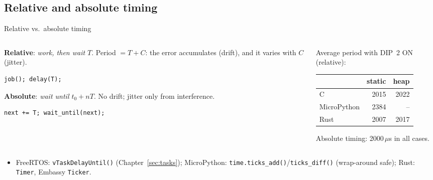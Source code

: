 \subsection{Relative and absolute timing}
\begin{frame}[fragile]{Relative vs.\ absolute timing}
  \begin{columns}[T]
    \begin{column}{0.5\textwidth}
      \small
      \textbf{Relative}: \emph{work, then wait $T$}. Period $= T + C$: the error accumulates (drift), and it varies with $C$ (jitter).
\begin{lstlisting}[numbers=none]
job(); delay(T);
\end{lstlisting}
      \textbf{Absolute}: \emph{wait until $t_0 + nT$}. No drift; jitter only from interference.
\begin{lstlisting}[numbers=none]
next += T; wait_until(next);
\end{lstlisting}
    \end{column}
    \begin{column}{0.48\textwidth}
      \small
      Average period with DIP~2 ON (relative):
      \begin{center}
      \begin{tabular}{@{}lrr@{}}
        \toprule
        & static & heap \\
        \midrule
        C & 2015 & 2022 \\
        MicroPython & 2384 & -- \\
        Rust & 2007 & 2017 \\
        \bottomrule
      \end{tabular}
      \end{center}
      Absolute timing: 2000\,$\mu$s in all cases.
    \end{column}
  \end{columns}
  \medskip
  \begin{itemize}
    \item FreeRTOS: \texttt{vTaskDelayUntil()} (Chapter~\ref{sec:tasks}); MicroPython: \texttt{time.ticks\_add()}/\texttt{ticks\_diff()} (wrap-around safe); Rust: \texttt{Timer}, Embassy \texttt{Ticker}.
  \end{itemize}
\end{frame}

